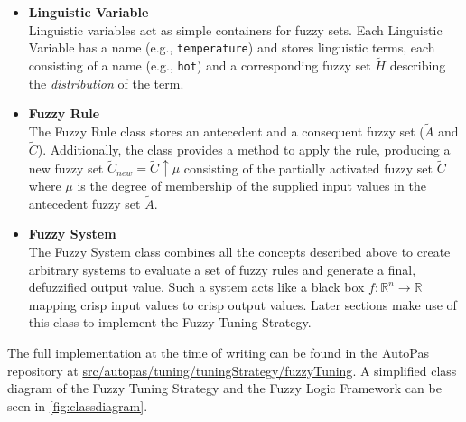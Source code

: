 \begin{itemize}
  \item \textbf{Linguistic Variable}\\
        Linguistic variables act as simple containers for fuzzy sets. Each Linguistic Variable has a name (e.g., \texttt{temperature}) and stores linguistic terms, each consisting of a name (e.g., \texttt{hot}) and a corresponding fuzzy set $\tilde{H}$ describing the \emph{distribution} of the term.

  \item \textbf{Fuzzy Rule}\\
        The Fuzzy Rule class stores an antecedent and a consequent fuzzy set ($\tilde{A}$ and $\tilde{C}$). Additionally, the class provides a method to apply the rule, producing a new fuzzy set $\tilde{C}_{new}=\tilde{C}\uparrow \mu$ consisting of the partially activated fuzzy set $\tilde{C}$ where $\mu$ is the degree of membership of the supplied input values in the antecedent fuzzy set $\tilde{A}$.

  \item \textbf{Fuzzy System}\\
        The Fuzzy System class combines all the concepts described above to create arbitrary systems to evaluate a set of fuzzy rules and generate a final, defuzzified output value. Such a system acts like a black box $f: \mathbb{R}^n \rightarrow \mathbb{R}$ mapping crisp input values to crisp output values. Later sections make use of this class to implement the Fuzzy Tuning Strategy.
\end{itemize}

\noindent The full implementation at the time of writing can be found in the AutoPas repository at \href{https://github.com/AutoPas/AutoPas/tree/f77f10f72c19a86d5471bce287ae3a4ae344c012/src/autopas/tuning/tuningStrategy/fuzzyTuning}{\color{blue}src/autopas/tuning/tuningStrategy/fuzzyTuning}. A simplified class diagram of the Fuzzy Tuning Strategy and the Fuzzy Logic Framework can be seen in \autoref{fig:classdiagram}.


